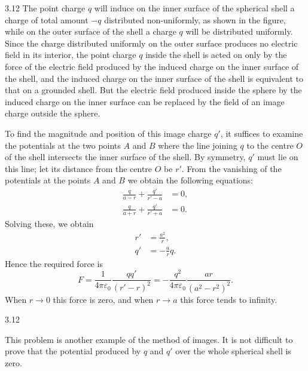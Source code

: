 \begin{solution}{3.12}
The point charge $q$ will induce on the inner surface of the spherical shell a charge of total amount $-q$ distributed non-uniformly, as shown in the figure, while on the outer surface of the shell a charge $q$ will be distributed uniformly. Since the charge distributed uniformly on the outer surface produces no electric field in its interior, the point charge $q$ inside the shell is acted on only by the force of the electric field produced by the induced charge on the inner surface of the shell, and the induced charge on the inner surface of the shell is equivalent to that on a grounded shell. But the electric field produced inside the sphere by the induced charge on the inner surface can be replaced by the field of an image charge outside the sphere.

To find the magnitude and position of this image charge $q'$, it suffices to examine the potentials at the two points $A$ and $B$ where the line joining $q$ to the centre $O$ of the shell intersects the inner surface of the shell. By symmetry, $q'$ must lie on this line; let its distance from the centre $O$ be $r'$. From the vanishing of the potentials at the points $A$ and $B$ we obtain the following equations:
\begin{align*}
\frac{q}{a-r}+\frac{q'}{r'-a}&=0,\\
\frac{q}{a+r}+\frac{q'}{r'+a}&=0.
\end{align*}
Solving these, we obtain
\begin{align*}
r'&=\frac{a^2}{r},\\
q'&=-\frac{a}{r}q.
\end{align*}
Hence the required force is
\[
F=\frac{1}{4\pi\varepsilon_0}\frac{qq'}{(r'-r)^2}
=-\frac{q^2}{4\pi\varepsilon_0}\frac{ar}{(a^2-r^2)^2}.
\]
When $r\to0$ this force is zero, and when $r\to a$ this force tends to infinity.

\begin{figbox}{3.12}
\end{figbox}

\begin{commentary}
This problem is another example of the method of images. It is not difficult to prove that the potential produced by $q$ and $q'$ over the whole spherical shell is zero.
\end{commentary}
\end{solution}

